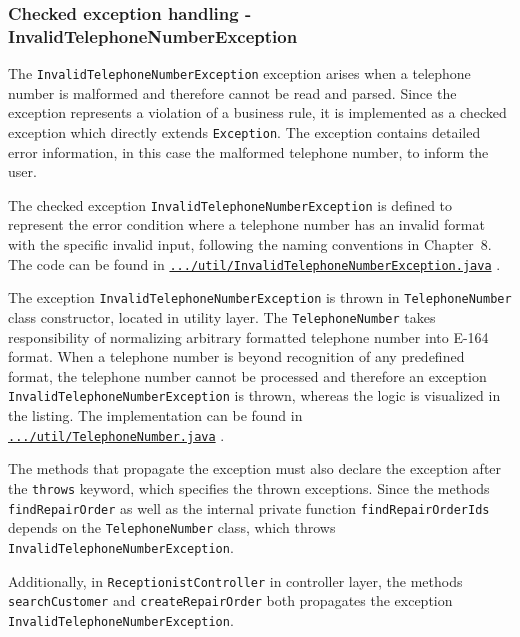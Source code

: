 \documentclass[a4paper]{scrartcl}
\begin{document}
\subsubsection{Checked exception handling - InvalidTelephoneNumberException}

The \texttt{InvalidTelephoneNumberException} exception arises when a telephone number is malformed and therefore cannot be read and parsed. Since the exception represents a violation of a business rule, it is implemented as a checked exception which directly extends \texttt{Exception}. The exception contains detailed error information, in this case the malformed telephone number, to inform the user.

The checked exception \texttt{InvalidTelephoneNumberException} is defined to represent the error condition where a telephone number has an invalid format with the specific invalid input, following the naming conventions in Chapter~8. The code can be found in \href{https://github.com/mo-mosverkstad/java-learning/blob/main/maven-projects/ElectricBikeRepair/src/main/java/se/ebikerepair/util/InvalidTelephoneNumberException.java}{\nolinkurl{.../util/InvalidTelephoneNumberException.java}} \cite{sourcecode}.

The exception \texttt{InvalidTelephoneNumberException} is thrown in \texttt{TelephoneNumber} class constructor, located in utility layer. The \texttt{TelephoneNumber} takes responsibility of normalizing arbitrary formatted telephone number into E-164 format. When a telephone number is beyond recognition of any predefined format, the telephone number cannot be processed and therefore an exception \texttt{InvalidTelephoneNumberException} is thrown, whereas the logic is visualized in the listing. The implementation can be found in \href{https://github.com/mo-mosverkstad/java-learning/blob/main/maven-projects/ElectricBikeRepair/src/main/java/se/ebikerepair/util/TelephoneNumber.java}{\nolinkurl{.../util/TelephoneNumber.java}} \cite{sourcecode}.

The methods that propagate the exception must also declare the exception after the \texttt{throws} keyword, which specifies the thrown exceptions. Since the methods \texttt{findRepairOrder} as well as the internal private function \texttt{findRepairOrderIds} depends on the \texttt{TelephoneNumber} class, which throws \texttt{InvalidTelephoneNumberException}.

Additionally, in \texttt{ReceptionistController} in controller layer, the methods \texttt{searchCustomer} and \texttt{createRepairOrder} both propagates the exception \texttt{InvalidTelephoneNumberException}.
\end{document}
